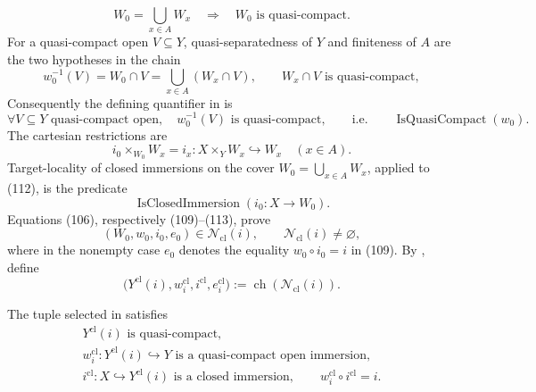 \begin{definition}
  \[
    W_0=\bigcup_{x\in A}W_x\quad\Longrightarrow\quad
    W_0\text{ is quasi-compact}.                                  \tag{110}
  \]
  For a quasi-compact open \(V\subseteq Y\), quasi-separatedness of \(Y\)
  and finiteness of \(A\) are the two hypotheses in the chain
  \[
    w_0^{-1}(V)=W_0\cap V
      =\bigcup_{x\in A}(W_x\cap V),\qquad
    W_x\cap V\text{ is quasi-compact},                             \tag{111}
  \]
  Consequently the defining quantifier in
   is
  \[
    \forall V\subseteq Y\text{ quasi-compact open},\quad
      w_0^{-1}(V)\text{ is quasi-compact},
    \qquad\text{i.e.}\qquad
    \operatorname{IsQuasiCompact}(w_0).
  \]
  The cartesian restrictions are
  \[
    i_0\times_{W_0}W_x
      =i_x\colon X\times_YW_x\hookrightarrow W_x\quad(x\in A).    \tag{112}
  \]
  Target-locality of closed immersions on the cover
  \(W_0=\bigcup_{x\in A}W_x\), applied to (112), is the predicate
  \[
    \operatorname{IsClosedImmersion}(i_0\colon X\to W_0).          \tag{113}
  \]
  Equations (106), respectively (109)--(113), prove
  \[
    (W_0,w_0,i_0,e_0)\in\mathscr N_{\mathrm{cl}}(i),\qquad
    \mathscr N_{\mathrm{cl}}(i)\neq\varnothing,                    \tag{114}
  \]
  where in the nonempty case
  \(e_0\) denotes the equality \(w_0\circ i_0=i\) in (109).
  By , define
  \[
    \bigl(Y^{\mathrm{cl}}(i),w_i^{\mathrm{cl}},
      i^{\mathrm{cl}},e_i^{\mathrm{cl}}\bigr)
      :=\operatorname{ch}(\mathscr N_{\mathrm{cl}}(i)).            \tag{115}
  \]
\end{definition}

\begin{lemma}
  \label{lemma:nagata-immersion-shrink-to-closed}
  \lean{}

  The tuple selected in
   satisfies
  \[
  \begin{gathered}
    Y^{\mathrm{cl}}(i)\text{ is quasi-compact},\\
    w_i^{\mathrm{cl}}\colon Y^{\mathrm{cl}}(i)\hookrightarrow Y
      \text{ is a quasi-compact open immersion},\\
    i^{\mathrm{cl}}\colon X\hookrightarrow Y^{\mathrm{cl}}(i)
      \text{ is a closed immersion},\qquad
    w_i^{\mathrm{cl}}\circ i^{\mathrm{cl}}=i.
  \end{gathered}
  \]
\end{lemma}


